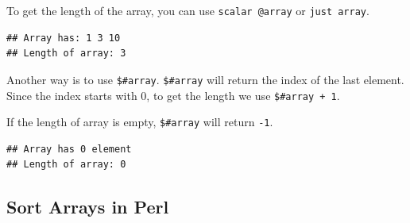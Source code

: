 \documentclass[]{book}
\makeatletter
\newenvironment{Shaded}{\begin{snugshade}}{\end{snugshade}}
\newcommand{\CharTok}[1]{\textcolor[rgb]{0.31,0.60,0.02}{#1}}
\newcommand{\CommentTok}[1]{\textcolor[rgb]{0.56,0.35,0.01}{\textit{#1}}}
\newcommand{\DataTypeTok}[1]{\textcolor[rgb]{0.13,0.29,0.53}{#1}}
\newcommand{\DecValTok}[1]{\textcolor[rgb]{0.00,0.00,0.81}{#1}}
\newcommand{\FunctionTok}[1]{\textcolor[rgb]{0.00,0.00,0.00}{#1}}
\newcommand{\KeywordTok}[1]{\textcolor[rgb]{0.13,0.29,0.53}{\textbf{#1}}}
\newcommand{\NormalTok}[1]{#1}
\newcommand{\StringTok}[1]{\textcolor[rgb]{0.31,0.60,0.02}{#1}}
\newenvironment{kframe}{%
\medskip{}
\setlength{\fboxsep}{.8em}
 \def\at@end@of@kframe{}%
 \ifinner\ifhmode%
  \def\at@end@of@kframe{\end{minipage}}%
  \begin{minipage}{\columnwidth}%
 \fi\fi%
 \def\FrameCommand##1{\hskip\@totalleftmargin \hskip-\fboxsep
 \colorbox{shadecolor}{##1}\hskip-\fboxsep
     \hskip-\linewidth \hskip-\@totalleftmargin \hskip\columnwidth}%
 \MakeFramed {\advance\hsize-\width
   \@totalleftmargin\z@ \linewidth\hsize
   \@setminipage}}%
 {\par\unskip\endMakeFramed%
 \at@end@of@kframe}
\renewenvironment{Shaded}{\begin{kframe}}{\end{kframe}}
\makeatother
\begin{document}
To get the length of the array, you can use \texttt{scalar\ @array} or \texttt{just\ array}.

\begin{Shaded}
\end{Shaded}

\begin{verbatim}
## Array has: 1 3 10
## Length of array: 3
\end{verbatim}

Another way is to use \texttt{\$\#array}. \texttt{\$\#array} will return the index of the last element. Since the index starts with 0, to get the length we use \texttt{\$\#array\ +\ 1}.

If the length of array is empty, \texttt{\$\#array} will return \texttt{-1}.

\begin{Shaded}
\end{Shaded}

\begin{verbatim}
## Array has 0 element
## Length of array: 0
\end{verbatim}

\hypertarget{sort-arrays-in-perl}{%
\subsection{Sort Arrays in Perl}\label{sort-arrays-in-perl}}
\end{document}
